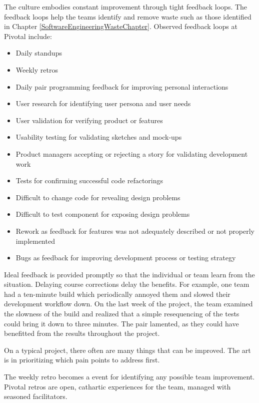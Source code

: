 The culture embodies constant improvement through tight feedback loops. The feedback loops help the teams identify and remove waste such as those identified in Chapter \ref{SoftwareEngineeringWasteChapter}. 
Observed feedback loops at Pivotal include:
\begin{itemize}
  \item Daily standups
  \item Weekly retros
  \item Daily pair programming feedback for improving personal interactions
  \item User research for identifying user persona and user needs
  \item User validation for verifying product or features
  \item Usability testing for validating sketches and mock-ups
  \item Product managers accepting or rejecting a story for validating development work
  \item Tests for confirming successful code refactorings 
  \item Difficult to change code for revealing design problems
  \item Difficult to test component for exposing design problems
  \item Rework as feedback for features was not adequately described or not properly implemented
  \item Bugs as feedback for improving development process or testing strategy 
\end{itemize}


Ideal feedback is provided promptly so that the individual or team learn from the situation. Delaying course corrections delay the benefits. For example, one team had a ten-minute build which periodically annoyed them and slowed their development workflow down. On the last week of the project, the team examined the slowness of the build and realized that a simple resequencing of the tests could bring it down to three minutes. The pair lamented,  as they could have benefitted from the results throughout the project. 


On a typical project, there often are many things that can be improved. The art is in prioritizing which pain points to address first. 


The weekly retro becomes a  event for identifying any possible team improvement. Pivotal retros are open, cathartic experiences for the team, managed with seasoned facilitators. 
